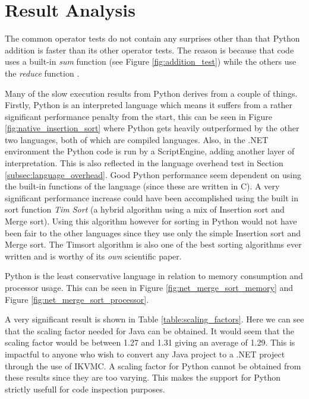 \section{Result Analysis}

The common operator tests do not contain any surprises other than that Python addition is faster than its other operator tests. The reason is because that code uses a built-in \textit{sum} function \cite{PythonSum} (see Figure \ref{fig:addition_test}) while the others use the \textit{reduce} function \cite{PythonReduce}.

Many of the slow execution results from Python derives from a couple of things. Firstly, Python is an interpreted language which means it suffers from a rather significant performance penalty from the start, this can be seen in Figure \ref{fig:native_insertion_sort} where Python gets heavily outperformed by the other two languages, both of which are compiled languages. Also, in the .NET environment the Python code is run by a ScriptEngine, adding another layer of interpretation. This is also reflected in the language overhead test in Section \ref{subsec:language_overhead}. Good Python performance seem dependent on using the built-in functions of the language (since these are written in C). A very significant performance increase could have been accomplished using the built in sort function \textit{Tim Sort} \cite{PythonSort} (a hybrid algorithm using a mix of Insertion sort and Merge sort). Using this algorithm however for sorting in Python would not have been fair to the other languages since they use only the simple Insertion sort and Merge sort. The Timsort algorithm is also one of the best sorting algorithms ever written and is worthy of its \textit{own} scientific paper.

Python is the least conservative language in relation to memory consumption and processor usage. This can be seen in Figure \ref{fig:net_merge_sort_memory} and Figure \ref{fig:net_merge_sort_processor}.

A very significant result is shown in Table \ref{table:scaling_factors}. Here we can see that the scaling factor needed for Java can be obtained. It would seem that the scaling factor would be between 1.27 and 1.31 giving an average of 1.29. This is impactful to anyone who wish to convert any Java project to a .NET project through the use of IKVMC. A scaling factor for Python cannot be obtained from these results since they are too varying. This makes the support for Python strictly usefull for code inspection purposes.
